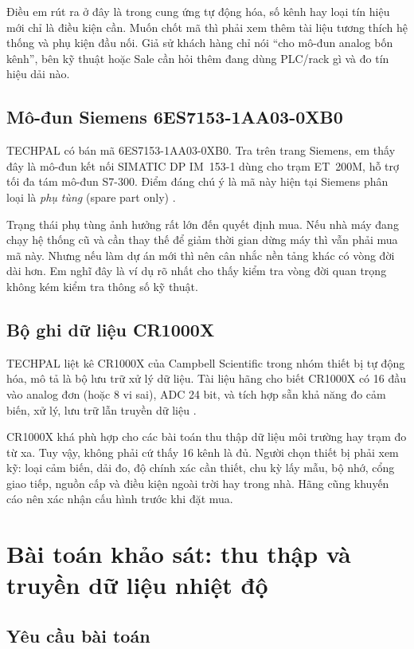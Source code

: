 Điều em rút ra ở đây là trong cung ứng tự động hóa, số kênh hay loại tín hiệu
mới chỉ là điều kiện cần. Muốn chốt mã thì phải xem thêm tài liệu tương thích
hệ thống và phụ kiện đầu nối. Giả sử khách hàng chỉ nói ``cho mô-đun analog bốn
kênh'', bên kỹ thuật hoặc Sale cần hỏi thêm đang dùng PLC/rack gì và đo tín
hiệu dải nào.

\subsection{Mô-đun Siemens 6ES7153-1AA03-0XB0}

TECHPAL có bán mã 6ES7153-1AA03-0XB0. Tra trên trang Siemens, em thấy đây là
mô-đun kết nối SIMATIC DP IM~153-1 dùng cho trạm ET~200M, hỗ trợ tối đa tám
mô-đun S7-300. Điểm đáng chú ý là mã này hiện tại Siemens phân loại là
\textit{phụ tùng} (spare part only) \cite{siemens-im153}.

Trạng thái phụ tùng ảnh hưởng rất lớn đến quyết định mua. Nếu nhà máy đang chạy
hệ thống cũ và cần thay thế để giảm thời gian dừng máy thì vẫn phải mua mã này.
Nhưng nếu làm dự án mới thì nên cân nhắc nền tảng khác có vòng đời dài hơn. Em
nghĩ đây là ví dụ rõ nhất cho thấy kiểm tra vòng đời quan trọng không kém kiểm
tra thông số kỹ thuật.

\subsection{Bộ ghi dữ liệu CR1000X}

TECHPAL liệt kê CR1000X của Campbell Scientific trong nhóm thiết bị tự động hóa,
mô tả là bộ lưu trữ xử lý dữ liệu. Tài liệu hãng cho
biết CR1000X có 16 đầu vào analog đơn (hoặc 8 vi sai), ADC 24 bit, và tích hợp
sẵn khả năng đo cảm biến, xử lý, lưu trữ lẫn truyền dữ liệu
\cite{techpal-cr1000x,campbell-cr1000x}.

CR1000X khá phù hợp cho các bài toán thu thập dữ liệu môi trường hay trạm đo
từ xa. Tuy vậy, không phải cứ thấy 16 kênh là đủ. Người chọn thiết bị phải xem
kỹ: loại cảm biến, dải đo, độ chính xác cần thiết, chu kỳ lấy mẫu, bộ nhớ, cổng
giao tiếp, nguồn cấp và điều kiện ngoài trời hay trong nhà. Hãng cũng khuyến cáo
nên xác nhận cấu hình trước khi đặt mua.

\section{Bài toán khảo sát: thu thập và truyền dữ liệu nhiệt độ}

\subsection{Yêu cầu bài toán}

